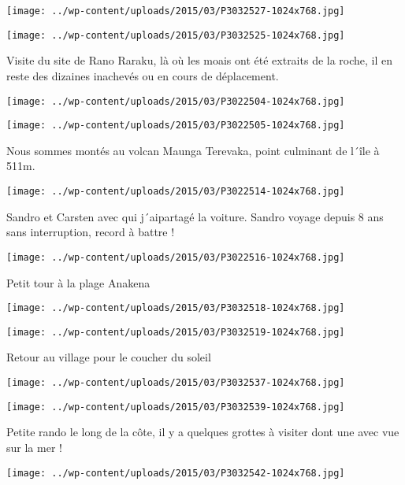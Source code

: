  \newline
 \newline
\centerline{\texttt{[image: ../wp-content/uploads/2015/03/P3032527-1024x768.jpg]} } 
 \newline
\centerline{\texttt{[image: ../wp-content/uploads/2015/03/P3032525-1024x768.jpg]} } 
Visite du site de Rano Raraku, là où les moais ont été extraits de la roche, il en reste des dizaines inachevés ou en cours de déplacement. \newline
 \newline
\centerline{\texttt{[image: ../wp-content/uploads/2015/03/P3022504-1024x768.jpg]} } 
 \newline
\centerline{\texttt{[image: ../wp-content/uploads/2015/03/P3022505-1024x768.jpg]} } 
 \newline
 Nous sommes montés au volcan Maunga Terevaka, point culminant de l´île à 511m. \newline
 \newline
\centerline{\texttt{[image: ../wp-content/uploads/2015/03/P3022514-1024x768.jpg]} } 
 \newline
 Sandro et Carsten avec qui j´aipartagé la voiture. Sandro voyage depuis 8 ans sans interruption, record à battre !\newline
\centerline{\texttt{[image: ../wp-content/uploads/2015/03/P3022516-1024x768.jpg]} } 
Petit tour à la plage Anakena \newline
 \newline
\centerline{\texttt{[image: ../wp-content/uploads/2015/03/P3032518-1024x768.jpg]} } 
 \newline
\centerline{\texttt{[image: ../wp-content/uploads/2015/03/P3032519-1024x768.jpg]} } 
Retour au village pour le coucher du soleil \newline
 \newline
\centerline{\texttt{[image: ../wp-content/uploads/2015/03/P3032537-1024x768.jpg]} } 
 \newline
\centerline{\texttt{[image: ../wp-content/uploads/2015/03/P3032539-1024x768.jpg]} } 
 \newline
 Petite rando le long de la côte, il y a quelques grottes à visiter dont une avec vue sur la mer ! \newline
 \newline
\centerline{\texttt{[image: ../wp-content/uploads/2015/03/P3032542-1024x768.jpg]} } 
 \newline
